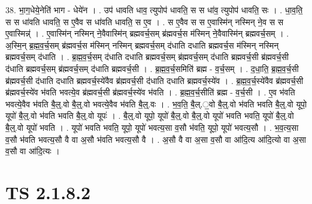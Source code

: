 \documentclass[17pt]{extarticle}
\begin{document}
38. भा॒ग॒धेये॒नेति॑ भाग - धेये॑न । . उप॑ धावति धाव॒ त्युपोप॑ धावति॒ स स धा॑व॒ त्युपोप॑ धावति॒ सः । . धा॒व॒ति॒ स स धा॑वति धावति॒ स ए॒वैव स धा॑वति धावति॒ स ए॒व । . स ए॒वैव स स ए॒वास्मि॑न् नस्मिन् ने॒व स स ए॒वास्मिन्न्॑ । . ए॒वास्मि॑न् नस्मिन् ने॒वैवास्मि॑न् ब्रह्मवर्च॒सम् ब्र॑ह्मवर्च॒स म॑स्मिन् ने॒वैवास्मि॑न् ब्रह्मवर्च॒सम् । . अ॒स्मि॒न् ब्र॒ह्म॒व॒र्च॒सम् ब्र॑ह्मवर्च॒स म॑स्मिन् नस्मिन् ब्रह्मवर्च॒सम् द॑धाति दधाति ब्रह्मवर्च॒स म॑स्मिन् नस्मिन् ब्रह्मवर्च॒सम् द॑धाति । . ब्र॒ह्म॒व॒र्च॒सम् द॑धाति दधाति ब्रह्मवर्च॒सम् ब्र॑ह्मवर्च॒सम् द॑धाति ब्रह्मवर्च॒सी ब्र॑ह्मवर्च॒सी द॑धाति ब्रह्मवर्च॒सम् ब्र॑ह्मवर्च॒सम् द॑धाति ब्रह्मवर्च॒सी । . ब्र॒ह्म॒व॒र्च॒समिति॑ ब्रह्म - व॒र्च॒सम् । . द॒धा॒ति॒ ब्र॒ह्म॒व॒र्च॒सी ब्र॑ह्मवर्च॒सी द॑धाति दधाति ब्रह्मवर्च॒स्ये॑वैव ब्र॑ह्मवर्च॒सी द॑धाति दधाति ब्रह्मवर्च॒स्ये॑व । . ब्र॒ह्म॒व॒र्च॒स्ये॑वैव ब्र॑ह्मवर्च॒सी ब्र॑ह्मवर्च॒स्ये॑व भ॑वति भवत्ये॒व ब्र॑ह्मवर्च॒सी ब्र॑ह्मवर्च॒स्ये॑व भ॑वति । . ब्र॒ह्म॒व॒र्च॒सीति॑ ब्रह्म - व॒र्च॒सी । . ए॒व भ॑वति भवत्ये॒वैव भ॑वति बै॒ल्॒.वो बै॒ल्॒.वो भवत्ये॒वैव भ॑वति बै॒ल्॒.वः । . भ॒व॒ति॒ बै॒ल्.॒वो बै॒ल्॒.वो भ॑वति भवति बै॒ल्॒.वो यूपो॒ यूपो॑ बै॒ल्॒.वो भ॑वति भवति बै॒ल्॒.वो यूपः॑ । . बै॒ल्॒.वो यूपो॒ यूपो॑ बै॒ल्॒.वो बै॒ल्॒.वो यूपो॑ भवति भवति॒ यूपो॑ बै॒ल्॒.वो बै॒ल्॒.वो यूपो॑ भवति । . यूपो॑ भवति भवति॒ यूपो॒ यूपो॑ भवत्य॒सा व॒सौ भ॑वति॒ यूपो॒ यूपो॑ भवत्य॒सौ । . भ॒व॒त्य॒सा व॒सौ भ॑वति भवत्य॒सौ वै वा अ॒सौ भ॑वति भवत्य॒सौ वै । . अ॒सौ वै वा अ॒सा व॒सौ वा आ॑दि॒त्य आ॑दि॒त्यो वा अ॒सा व॒सौ वा आ॑दि॒त्यः । \newline
\pagebreak
{}
\section*{ TS 2.1.8.2 }
\end{document}
